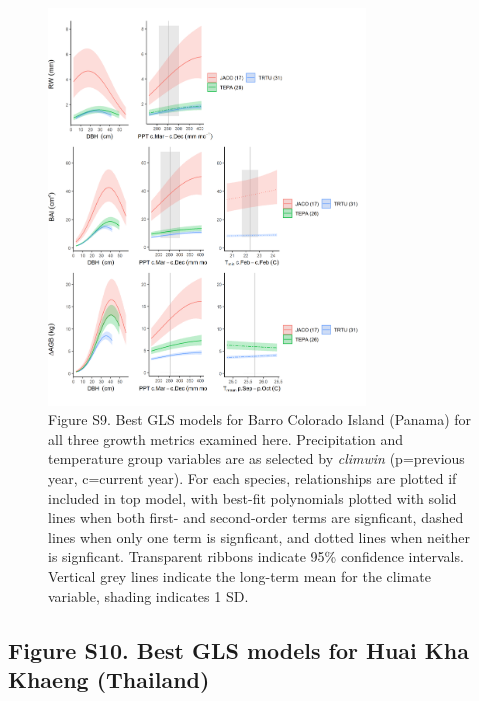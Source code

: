\documentclass[
]{article}
\begin{document}
\begin{figure}
\centering
\includegraphics[width=0.75\textwidth,height=\textheight]{tables_figures/SI_figures/composite_plots/BCI.png}
\caption{Figure S9. Best GLS models for Barro Colorado Island (Panama)
for all three growth metrics examined here. Precipitation and
temperature group variables are as selected by \emph{climwin}
(p=previous year, c=current year). For each species, relationships are
plotted if included in top model, with best-fit polynomials plotted with
solid lines when both first- and second-order terms are signficant,
dashed lines when only one term is signficant, and dotted lines when
neither is signficant. Transparent ribbons indicate 95\% confidence
intervals. Vertical grey lines indicate the long-term mean for the
climate variable, shading indicates 1 SD.}
\end{figure}

\newpage

\hypertarget{figure-s10.-best-gls-models-for-huai-kha-khaeng-thailand}{%
\subsection{Figure S10. Best GLS models for Huai Kha Khaeng
(Thailand)}\label{figure-s10.-best-gls-models-for-huai-kha-khaeng-thailand}}
\end{document}

